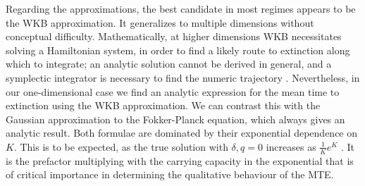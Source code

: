 Regarding the approximations, the best candidate in most regimes appears to be the WKB approximation. 
It generalizes to multiple dimensions without conceptual difficulty.
Mathematically, at higher dimensions WKB necessitates solving a Hamiltonian system, in order to find a likely route to extinction along which to integrate; an analytic solution cannot be derived in general, and a symplectic integrator is necessary to find the numeric trajectory \cite{}. 
Nevertheless, in our one-dimensional case we find an analytic expression for the mean time to extinction using the WKB approximation.%
We can contrast this with the Gaussian approximation to the Fokker-Planck equation, which always gives an analytic result.%
Both formulae are dominated by their exponential dependence on $K$. 
This is to be expected, as the true solution with $\delta,q = 0$ increases as $\frac{1}{K}e^K$ \cite{Lande1993}. 
It is the prefactor multiplying with the carrying capacity in the exponential that is of critical importance in determining the qualitative behaviour of the MTE. 
